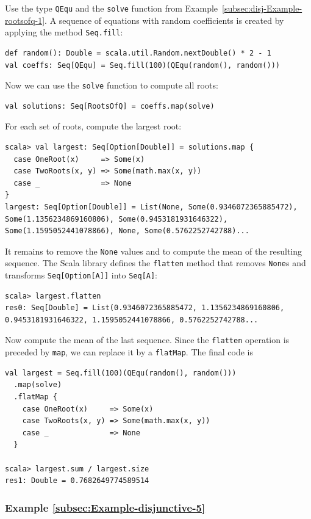 Use the type \lstinline!QEqu! and the \lstinline!solve! function
from Example~\ref{subsec:disj-Example-rootsofq-1}. A sequence of
equations with random coefficients is created by applying the method
\lstinline!Seq.fill!:
\begin{lstlisting}
def random(): Double = scala.util.Random.nextDouble() * 2 - 1
val coeffs: Seq[QEqu] = Seq.fill(100)(QEqu(random(), random()))
\end{lstlisting}
Now we can use the \lstinline!solve! function to compute all roots:
\begin{lstlisting}
val solutions: Seq[RootsOfQ] = coeffs.map(solve)
\end{lstlisting}
For each set of roots, compute the largest root:
\begin{lstlisting}
scala> val largest: Seq[Option[Double]] = solutions.map {
  case OneRoot(x)     => Some(x)
  case TwoRoots(x, y) => Some(math.max(x, y))
  case _              => None
}
largest: Seq[Option[Double]] = List(None, Some(0.9346072365885472), Some(1.1356234869160806), Some(0.9453181931646322), Some(1.1595052441078866), None, Some(0.5762252742788)...
\end{lstlisting}
It remains to remove the \lstinline!None! values and to compute the
mean of the resulting sequence. The Scala library defines the \lstinline!flatten!
method that removes \lstinline!None!s and transforms \lstinline!Seq[Option[A]]!
into \lstinline!Seq[A]!:
\begin{lstlisting}
scala> largest.flatten
res0: Seq[Double] = List(0.9346072365885472, 1.1356234869160806, 0.9453181931646322, 1.1595052441078866, 0.5762252742788...
\end{lstlisting}
Now compute the mean of the last sequence. Since the \lstinline!flatten!
operation is preceded by \lstinline!map!, we can replace it by a
\lstinline!flatMap!. The final code is
\begin{lstlisting}
val largest = Seq.fill(100)(QEqu(random(), random()))
  .map(solve)
  .flatMap {
    case OneRoot(x)     => Some(x)
    case TwoRoots(x, y) => Some(math.max(x, y))
    case _              => None
  }

scala> largest.sum / largest.size
res1: Double = 0.7682649774589514
\end{lstlisting}


\subsubsection{Example \label{subsec:Example-disjunctive-5}\ref{subsec:Example-disjunctive-5}}

